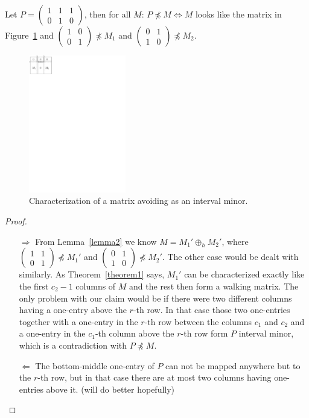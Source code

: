 \documentclass[12pt,a4paper]{report}
\begin{document}
\begin{thm}
Let $P=\left(\begin{smallmatrix}1&1&1\\0&1&0\end{smallmatrix}\right)$, then for all $M$: $P\not\preceq M\Leftrightarrow M$ looks like the matrix in Figure~\ref{p52} and $\left(\begin{smallmatrix}1&0\\0&1\end{smallmatrix}\right)\not\preceq M_1$ and $\left(\begin{smallmatrix}0&1\\1&0\end{smallmatrix}\right)\not\preceq M_2$.
\end{thm}
\begin{figure}[h!]
\centering
\includegraphics[height=60mm]{img/p52.pdf}
\caption{Characterization of a matrix avoiding \usebox{\smlmatb} as an interval minor.}
\label{p52}
\end{figure}
\begin{proof}
\begin{itemize}
\item[$\Rightarrow$] From Lemma~\ref{lemma2} we know $M=M_1'\oplus_hM_2'$, where $\left(\begin{smallmatrix}1&1\\0&1\end{smallmatrix}\right)\not\preceq M_1'$ and $\left(\begin{smallmatrix}0&1\\1&0\end{smallmatrix}\right)\not\preceq M_2'$. The other case would be dealt with similarly. As Theorem~\ref{theorem1} says, $M_1'$ can be characterized exactly like the first $c_2-1$ columns of $M$ and the rest then form a walking matrix. The only problem with our claim would be if there were two different columns having a one-entry above the $r$-th row. In that case those two one-entries together with a one-entry in the $r$-th row between the columns $c_1$ and $c_2$ and a one-entry in the $c_1$-th column above the $r$-th row form $P$ interval minor, which is a contradiction with $P\not\preceq M$.
\item[$\Leftarrow$] The bottom-middle one-entry of $P$ can not be mapped anywhere but to the $r$-th row, but in that case there are at most two columns having one-entries above it. (will do better hopefully)
\end{itemize}
\end{proof}
\end{document}
